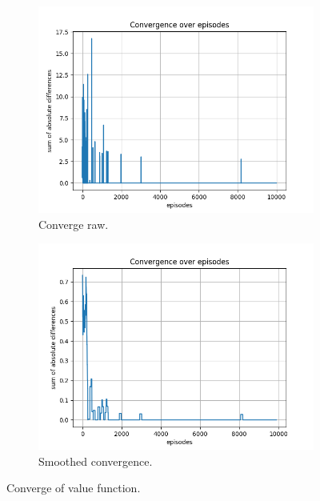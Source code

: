 \documentclass{assignment}
\begin{document}
\begin{figure}[H]
    \begin{subfigure}{0.5\textwidth}
        \includegraphics[width=\textwidth]{figures/convergence_q/gamma_sweep/convergence_Q_alpha_0.1_gamma_0.1_epislon_0.2.png}
    \caption{Converge raw.}
    \end{subfigure}\hfill
    \begin{subfigure}{0.5\textwidth}
        \includegraphics[width=\textwidth]{figures/convergence_q/gamma_sweep/convergence_Q_smoothed_alpha_0.1_gamma_0.1_epislon_0.2.png}
    \caption{Smoothed convergence.}
    \end{subfigure}
    \caption{Converge of value function.}
    \label{fig:gamma_0.1_q_learning_convergence}
\end{figure}
\end{document}
